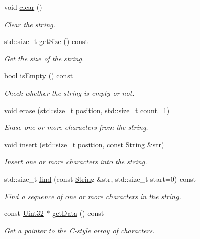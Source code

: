 \begin{DoxyCompactItemize}
void \hyperlink{classburn_1_1_string_a17785eac89172fb6a86a6ff2018317d1}{clear} ()
\begin{DoxyCompactList}\small\item\em Clear the string. \end{DoxyCompactList}\item 
std\-::size\-\_\-t \hyperlink{classburn_1_1_string_a2551be01727cdd3c82671c49923e7ba0}{get\-Size} () const 
\begin{DoxyCompactList}\small\item\em Get the size of the string. \end{DoxyCompactList}\item 
bool \hyperlink{classburn_1_1_string_a5723443c8aa152bb6451252dabec7640}{is\-Empty} () const 
\begin{DoxyCompactList}\small\item\em Check whether the string is empty or not. \end{DoxyCompactList}\item 
void \hyperlink{classburn_1_1_string_aa82d8a0adc6f39448835cca4ae81c5ef}{erase} (std\-::size\-\_\-t position, std\-::size\-\_\-t count=1)
\begin{DoxyCompactList}\small\item\em Erase one or more characters from the string. \end{DoxyCompactList}\item 
void \hyperlink{classburn_1_1_string_a106dfd5ead837b8908142289dfaf531c}{insert} (std\-::size\-\_\-t position, const \hyperlink{classburn_1_1_string}{String} \&str)
\begin{DoxyCompactList}\small\item\em Insert one or more characters into the string. \end{DoxyCompactList}\item 
std\-::size\-\_\-t \hyperlink{classburn_1_1_string_add934aa6197f730de79445a18942a5fc}{find} (const \hyperlink{classburn_1_1_string}{String} \&str, std\-::size\-\_\-t start=0) const 
\begin{DoxyCompactList}\small\item\em Find a sequence of one or more characters in the string. \end{DoxyCompactList}\item 
const \hyperlink{namespaceburn_ab40b09022209bd449d317c1f0e95356b}{Uint32} $\ast$ \hyperlink{classburn_1_1_string_ac640bcb974455719360ccd4ff8989acf}{get\-Data} () const 
\begin{DoxyCompactList}\small\item\em Get a pointer to the C-\/style array of characters. \end{DoxyCompactList}\item 

\end{DoxyCompactItemize}
